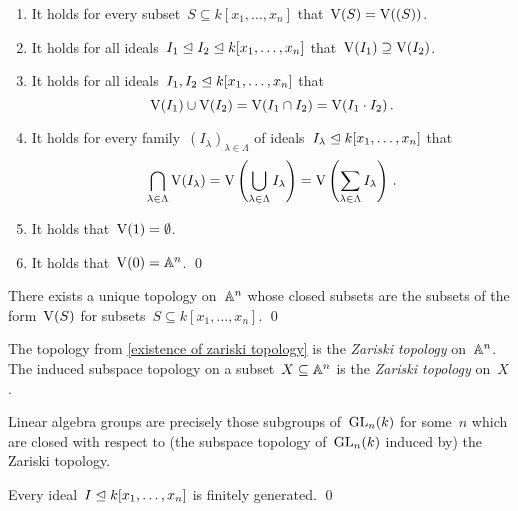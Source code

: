 \begin{lemma}
  \label{properties of vanishing sets}
  \leavevmode
  \begin{enumerate}
    \item
      It holds for every subset~$S \subseteq k[x_1, \dotsc, x_n]$ that~$\operatorname{V}(S) = \operatorname{V}( (S) )$.
    \item
      It holds for all ideals~$I_1 \trianglelefteq I_2 \trianglelefteq k[x_1, \dotsc, x_n]$ that~$\operatorname{V}(I_1) \supseteq \operatorname{V}(I_2)$.
    \item
      It holds for all ideals~$I_1, I_2 \trianglelefteq k[x_1, \dotsc, x_n]$ that
      \[
          \operatorname{V}(I_1) \cup \operatorname{V}(I_2)
        = \operatorname{V}(I_1 \cap I_2)
        = \operatorname{V}(I_1 \cdot I_2) \,.
      \]
    \item
      It holds for every family~$(I_\lambda)_{\lambda \in \Lambda}$ of ideals~$I_\lambda \trianglelefteq k[x_1, \dotsc, x_n]$ that
      \[
          \bigcap_{\lambda \in \Lambda} \operatorname{V}(I_\lambda)
        = \operatorname{V}\left( \bigcup_{\lambda \in \Lambda} I_\lambda \right)
        = \operatorname{V}\left( \sum_{\lambda \in \Lambda} I_\lambda \right) \,.
      \]
    \item
      It holds that~$\operatorname{V}(1) = \emptyset$.
    \item
      It holds that~$\operatorname{V}(0) = \mathbb{A}^n$.
    \qed
  \end{enumerate}
\end{lemma}


\begin{corollary}
  \label{existence of zariski topology}
  There exists a unique topology on~$\mathbb{A}^n$ whose closed subsets are the subsets of the form~$\operatorname{V}(S)$ for subsets~$S \subseteq k[x_1, \dotsc, x_n]$.
  \qed
\end{corollary}


\begin{definition}
  The topology from \cref{existence of zariski topology} is the \emph{Zariski topology} on~$\mathbb{A}^n$.
  The induced subspace topology on a subset~$X \subseteq \mathbb{A}^n$ is the \emph{Zariski topology} on~$X$.
\end{definition}


\begin{remark}
  Linear algebra groups are precisely those subgroups of~$\operatorname{GL}_n(k)$ for some~$n$ which are closed with respect to (the subspace topology of~$\operatorname{GL}_n(k)$ induced by) the Zariski topology.
\end{remark}


\begin{theorem}[Hilbert]
  Every ideal~$I \trianglelefteq k[x_1, \dotsc, x_n]$ is finitely generated.
  \qed
\end{theorem}


